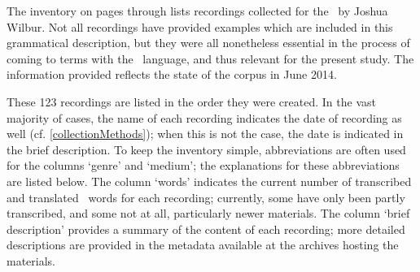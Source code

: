 %

\label{inventory}\hypertarget{inventoryRef}{}
The inventory on pages \pageref{inventoryBegin} through \pageref{inventoryEnd} 
lists recordings collected for the \PSDP\ by Joshua Wilbur. Not all recordings have provided examples which are included in this grammatical description, but they were all nonetheless essential in the process of coming to terms with the \PS\ language, and thus relevant for the present study. 
The information provided reflects the state of the corpus in June 2014. 

These 123 recordings are listed in the order they were created. In the vast majority of cases, the name of each recording indicates the date of recording as well (cf. \SEC\ref{collectionMethods}); when this is not the case, the date is indicated in the brief description. To keep the inventory simple, %
abbreviations are often used for the columns ‘genre’ and ‘medium’; %
the explanations for these abbreviations are listed below. %
The column ‘words’ indicates the current number of transcribed and translated \PS\ words for each recording; currently, some have only been partly transcribed, and some not at all, particularly newer materials. 
The column ‘brief description’ provides a summary of the content of each recording; more detailed descriptions are provided in the metadata available at the archives hosting the materials. 

\vfill

